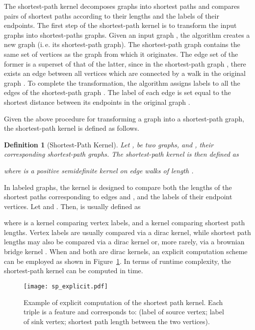\documentclass[twoside,11pt]{article}
\newcommand{\ie}{i.\,e. }
\newtheorem{definition}{Definition}
\begin{document}
The shortest-path kernel decomposes graphs into shortest paths and compares pairs of shortest paths according to their lengths and the labels of their endpoints.
The first step of the shortest-path kernel is to transform the input graphs into shortest-paths graphs.
Given an input graph , the algorithm creates a new graph  (\ie its shortest-path graph).
The shortest-path graph  contains the same set of vertices as the graph from which it originates.
The edge set of the former is a superset of that of the latter, since in the shortest-path graph , there exists an edge between all vertices which are connected by a walk in the original graph .
To complete the transformation, the algorithm assigns labels to all the edges of the shortest-path graph .
The label of each edge is set equal to the shortest distance between its endpoints in the original graph .

Given the above procedure for transforming a graph into a shortest-path graph, the shortest-path kernel is defined as follows.
\begin{definition}[Shortest-Path Kernel]
  Let ,  be two graphs, and ,  their corresponding shortest-path graphs.
  The shortest-path kernel is then defined as
  
  where  is a positive semidefinite kernel on edge walks of length .
\end{definition}
In labeled graphs, the  kernel is designed to compare both the lengths of the shortest paths corresponding to edges  and , and the labels of their endpoint vertices.
Let  and .
Then,  is usually defined as

where  is a kernel comparing vertex labels, and  a kernel comparing shortest path lengths.
Vertex labels are usually compared via a dirac kernel, while shortest path lengths may also be compared via a dirac kernel or, more rarely, via a brownian bridge kernel \cite{borgwardt2005shortest}.
When  and  both are dirac kernels, an explicit computation scheme can be employed as shown in Figure~\ref{fig:shortest_path}.
In terms of runtime complexity, the shortest-path kernel can be computed in  time.

\begin{figure}[t]
    \centering
    \texttt{[image: sp\_explicit.pdf]}
    \caption{Example of explicit computation of the shortest path kernel. Each triple is a feature and corresponds to: (label of source vertex; label of sink vertex; shortest path length between the two vertices).}
    \label{fig:shortest_path}
\end{figure}
\end{document}
